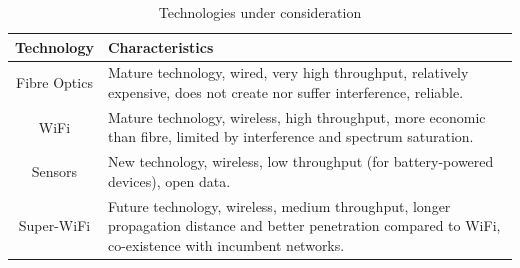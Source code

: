 \documentclass[draftclsnofoot,12pt,journal,onecolumn]{IEEEtran}
\begin{document}
\begin{table}[!t]
\renewcommand{\arraystretch}{1.3}
\caption{Technologies under consideration \cite{barcelo2012bub} }
\label{tab:technologies}
\centering
\begin{tabular}{|c|p{5cm}|}
\hline
Technology & Characteristics \\
\hline
Fibre Optics & Mature technology, wired, very high throughput, relatively expensive, does not create nor suffer interference, reliable. \\
WiFi & Mature technology, wireless, high throughput, more economic than fibre, limited by interference and spectrum saturation. \\
Sensors & New technology, wireless, low throughput (for battery-powered devices), open data. \\
Super-WiFi & Future technology, wireless, medium throughput, longer propagation distance and better penetration compared to WiFi, co-existence with incumbent networks.\\
\hline
\end{tabular}
\end{table}
\end{document}
